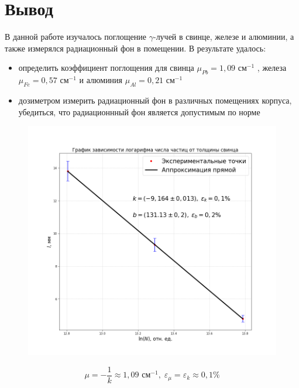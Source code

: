 \documentclass[a4paper,12pt]{article}
\begin{document}
\section{Вывод}
В данной работе изучалось поглощение $\gamma$-лучей в свинце, железе и алюминии, а также измерялся радиационный фон в помещении. В результате удалось:
\begin{itemize}
    \item
    определить коэффициент поглощения для свинца $\mu_{Pb} = 1,09 \text{ см}^{-1}$ , железа $\mu_{Fe} = 0,57 \text{ см}^{-1}$ и алюминия $\mu_{Al} = 0,21 \text{ см}^{-1}$
    
    \item
    дозиметром измерить радиационный фон в различных помещениях корпуса, убедиться, что радиационнный фон является допустимым по норме 
    
\end{itemize}

\newpage
\begin{figure}[H]\label{fig: l(lnN)Pb}
    \centering
    \includegraphics[width = \textwidth]{l(lnN)Pb.png}
\end{figure}

\[\mu = -\frac{1}{k} \approx 1,09 \text{ см}^{-1},\; \varepsilon_\mu = \varepsilon_k \approx 0,1\%\]
\end{document}
